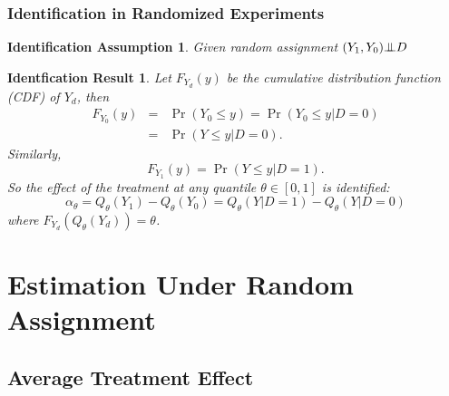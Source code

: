 \documentclass{beamer}
\numberwithin{equation}{section}
\newtheorem{iass}{Identification Assumption}
\newtheorem{ires}{Identfication Result}
\newcommand{\indep}{{\bot\negthickspace\negthickspace\bot}}
\begin{document}
\begin{frame}
  \frametitle{Identification in Randomized Experiments}
  \footnotesize
\begin{iass}
Given random assignment $(Y_1,Y_0) \indep D$
\end{iass}
\vspace{-.1in}
\begin{ires}\small
Let $F_{Y_d}(y)$ be the cumulative distribution function (CDF) of $Y_d$, then
\begin{eqnarray*}
F_{Y_0}(y) &=& \Pr(Y_0\leq y) = \Pr(Y_0\leq y | D=0)\\
&=&\Pr(Y\leq y | D=0).
\end{eqnarray*}
Similarly,
\[
F_{Y_1}(y)=\Pr(Y\leq y | D=1).
\]
So the effect of the treatment at any quantile $\theta\in[0,1]$  is identified:\[
\alpha_{\theta}=Q_\theta(Y_1)-Q_\theta(Y_0)=Q_\theta(Y|D=1)-Q_\theta(Y|D=0)
\] where $F_{Y_d} (Q_\theta(Y_d)) = \theta$.
\end{ires}
\end{frame}


\section{Estimation Under Random Assignment}


\subsection{Average Treatment Effect}
\end{document}
